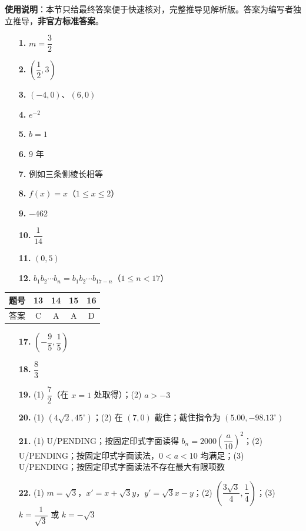 
\begin{gknotice}
\textbf{使用说明}：本节只给最终答案便于快速核对，完整推导见解析版。答案为编写者独立推导，\textbf{非官方标准答案}。
\end{gknotice}

\begin{itemize}[leftmargin=2.6em]
  \item[\textbf{1.}] $m=\dfrac{3}{2}$
  \item[\textbf{2.}] $\left(\dfrac{1}{2},3\right)$
  \item[\textbf{3.}] $(-4,0)$、$(6,0)$
  \item[\textbf{4.}] $e^{-2}$
  \item[\textbf{5.}] $b=1$
  \item[\textbf{6.}] $9$ 年
  \item[\textbf{7.}] 例如三条侧棱长相等
  \item[\textbf{8.}] $f(x)=x$（$1\leq x\leq2$）
  \item[\textbf{9.}] $-462$
  \item[\textbf{10.}] $\dfrac{1}{14}$
  \item[\textbf{11.}] $(0,5)$
  \item[\textbf{12.}] $b_1b_2\cdots b_n=b_1b_2\cdots b_{17-n}$（$1\leq n<17$）
\end{itemize}

\begin{center}\begin{tabular}{ccccc}
\toprule
题号 & 13 & 14 & 15 & 16 \\
\midrule
答案 & C & A & A & D \\
\bottomrule
\end{tabular}\end{center}

\begin{itemize}[leftmargin=2.6em]
  \item[\textbf{17.}] $\left(-\dfrac{9}{5},\dfrac{1}{5}\right)$
  \item[\textbf{18.}] $\dfrac{8}{3}$
  \item[\textbf{19.}] (1) $\dfrac{7}{2}$（在 $x=1$ 处取得）；(2) $a>-3$
  \item[\textbf{20.}] (1) $(4\sqrt{2},45^\circ)$；(2) 在 $(7,0)$ 截住；截住指令为 $(5.00,-98.13^\circ)$
  \item[\textbf{21.}] (1) U/PENDING；按固定印式字面读得 $b_n=2000\left(\dfrac{a}{10}\right)^2$；(2) U/PENDING；按固定印式字面读法，$0<a<10$ 均满足；(3) U/PENDING；按固定印式字面读法不存在最大有限项数
  \item[\textbf{22.}] (1) $m=\sqrt{3}$，$x'=x+\sqrt{3}y$，$y'=\sqrt{3}x-y$；(2) $\left(\dfrac{3\sqrt{3}}{4},\dfrac{1}{4}\right)$；(3) $k=\dfrac{1}{\sqrt{3}}$ 或 $k=-\sqrt{3}$
\end{itemize}
